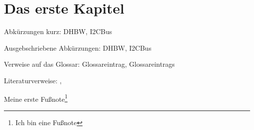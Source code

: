 \chapter{Das erste Kapitel}
Abkürzungen kurz: \acrshort{DHBW}, \acrshort{I2CBus} 

Ausgebschriebene Abkürzungen: \gls{DHBW}, \acrshort{I2CBus}

Verweise auf das Glossar: \gls{Glossareintrag}, \glspl{Glossareintrag}

Literaturverweise: \cite{bib:ix042010}, \cite{bib:metasploitBuch}

Meine erste Fußnote\footnote{Ich bin eine Fußnote}
